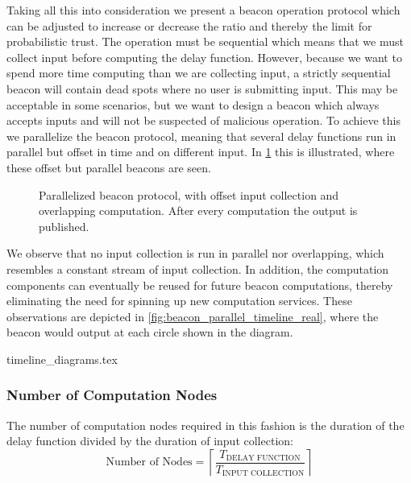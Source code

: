 Taking all this into consideration we present a beacon operation protocol which can be adjusted to increase or decrease the ratio and thereby the limit for probabilistic trust.
The operation must be sequential which means that we must collect input before computing the delay function.
However, because we want to spend more time computing than we are collecting input, a strictly sequential beacon will contain dead spots where no user is submitting input.
This may be acceptable in some scenarios, but we want to design a beacon which always accepts inputs and will not be suspected of malicious operation.
To achieve this we parallelize the beacon protocol, meaning that several delay functions run in parallel but offset in time and on different input.
In \cref{fig:beacon_parallel_timeline} this is illustrated, where these offset but parallel beacons are seen.

\begin{figure}[htb]
    \centering
    \footnotesize
    \caption{Parallelized beacon protocol, with offset input collection and overlapping computation.
After every computation the output is published.}\label{fig:beacon_parallel_timeline}
\end{figure}

We observe that no input collection is run in parallel nor overlapping, which resembles a constant stream of input collection.
In addition, the computation components can eventually be reused for future beacon computations, thereby eliminating the need for spinning up new computation services.
These observations are depicted in \cref{fig:beacon_parallel_timeline_real}, where the beacon would output at each circle shown in the diagram.

{timeline_diagrams.tex}

\subsubsection{Number of Computation Nodes}
The number of computation nodes required in this fashion is the duration of the delay function divided by the duration of input collection:
\begin{equation*}
    \text{Number of Nodes} = \left\lceil\frac{T_\text{DELAY FUNCTION}}{T_\text{INPUT COLLECTION}}\right\rceil
\end{equation*}

